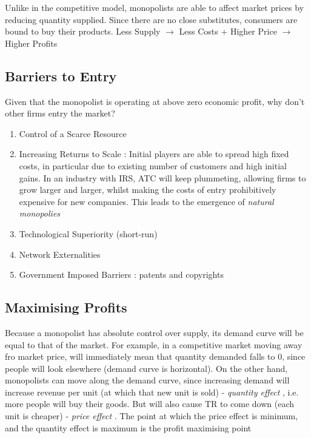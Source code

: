 \documentclass[english,course]{Notes}
\newcommand{\ita}[1]{\textit{#1}}
\begin{document}



\par{Unlike in the competitive model, monopolists are able to affect market prices by reducing quantity supplied. Since there are no close substitutes, consumers are bound to buy their products. Less Supply $\rightarrow$ Less Costs + Higher Price $\rightarrow$ Higher Profits}

\subsection{Barriers to Entry}

\par{Given that the monopolist is operating at above zero economic profit, why don't other firms entry the market?}

\begin{enumerate}
	\item Control of a Scarce Resource 
	\item Increasing Returns to Scale : Initial players are able to spread high fixed costs, in particular due to existing number of customers and high initial gains. In an industry with IRS, ATC will keep plummeting, allowing firms to grow larger and larger, whilst making the costs of entry prohibitively expensive for new companies. This leads to the emergence of \ita{natural monopolies}
	\item Technological Superiority (short-run)
	\item Network Externalities
	\item Government Imposed Barriers : patents and copyrights
\end{enumerate}

\subsection{Maximising Profits}

\par{Because a monopolist has absolute control over supply, its demand curve will be equal to that of the market. For example, in a competitive market moving away fro market price, will immediately mean that quantity demanded falls to $0$, since people will look elsewhere (demand curve is horizontal). On the other hand, monopolists can move along the demand curve, since increasing demand will increase revenue per unit (at which that new unit is sold) - \ita{quantity effect} , i.e. more people will buy their goods. But will also cause TR to come down (each unit is cheaper) - \ita{price effect} . The point at which the price effect is minimum, and the quantity effect is maximum is the profit maximising point}
\end{document}
